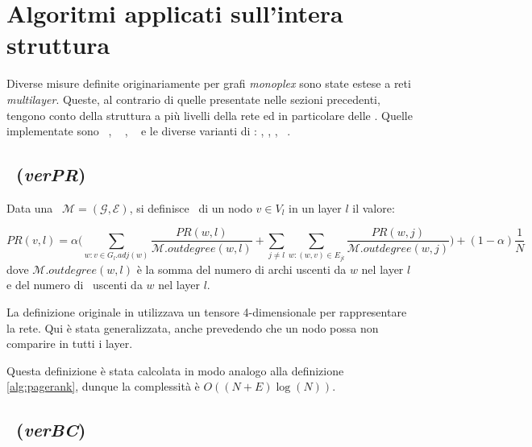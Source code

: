 \section{Algoritmi applicati sull'intera struttura}
Diverse misure definite originariamente per grafi \textit{monoplex} sono state estese a 
reti \textit{multilayer}. Queste, al contrario di quelle presentate nelle sezioni precedenti,
tengono conto della struttura a più livelli della rete ed in particolare delle \interc.
Quelle implementate sono 
\verPageRank~\cite{dedomenico:versatile},
\verBetweennessCentrality~\cite{dedomenico:versatile} \cite{dedomenico:verbetw},
\multiCore~\cite{azimi:multikcore} e le diverse varianti di \PCI: 
\mlPCI,
\laPCI,
\alPCI,
\lsPCI~\cite{basaras:infspmul}.

\subsection{\verPageRank~(\textit{verPR})}
\begin{definizione}[\verPageRank]
    Data una \muln\ $\mathcal{M}=(\mathcal{G}, \mathcal{E})$,
    si definisce \verPageRank\ di un nodo $v \in V_l$ in un layer $l$
    il valore:

    \begin{equation}
        PR(v, l) = 
        \alpha \biggl( 
            \sum_{w : v \in G_l.adj(w)} \frac{PR(w, l)}{\mathcal{M}.outdegree(w, l)} +
            \sum_{j \neq l}^{}\sum_{w : (w, v) \in E_{jl}} \frac{PR(w, j)}{\mathcal{M}.outdegree(w, j)} 
        \biggr) + (1-\alpha)\frac{1}{N}
    \end{equation}
    dove $\mathcal{M}.outdegree(w, l)$ è la somma del numero di archi uscenti da $w$ nel layer $l$
    e del numero di \interc\ uscenti da $w$ nel layer $l$.

\end{definizione}

La definizione originale in \cite{dedomenico:versatile} utilizzava un tensore 4-dimensionale per 
rappresentare la rete. Qui è stata generalizzata, anche prevedendo che un nodo possa non comparire 
in tutti i layer.

Questa definizione è stata calcolata in modo analogo alla definizione \vref{alg:pagerank},
dunque la complessità è $O((N + E)\log(N))$.

\subsection{\verBetweennessCentrality~(\textit{verBC})}

